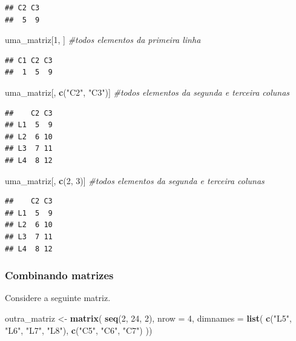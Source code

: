 \documentclass[
]{book}
\newenvironment{Shaded}{\begin{snugshade}}{\end{snugshade}}
\newcommand{\AttributeTok}[1]{\textcolor[rgb]{0.13,0.29,0.53}{#1}}
\newcommand{\CommentTok}[1]{\textcolor[rgb]{0.56,0.35,0.01}{\textit{#1}}}
\newcommand{\DecValTok}[1]{\textcolor[rgb]{0.00,0.00,0.81}{#1}}
\newcommand{\FunctionTok}[1]{\textcolor[rgb]{0.13,0.29,0.53}{\textbf{#1}}}
\newcommand{\NormalTok}[1]{#1}
\newcommand{\OtherTok}[1]{\textcolor[rgb]{0.56,0.35,0.01}{#1}}
\newcommand{\StringTok}[1]{\textcolor[rgb]{0.31,0.60,0.02}{#1}}
\begin{document}
\begin{verbatim}
## C2 C3 
##  5  9
\end{verbatim}

\begin{Shaded}
\begin{Highlighting}[]
\NormalTok{uma\_matriz[}\DecValTok{1}\NormalTok{, ] }\CommentTok{\#todos elementos da primeira linha}
\end{Highlighting}
\end{Shaded}

\begin{verbatim}
## C1 C2 C3 
##  1  5  9
\end{verbatim}

\begin{Shaded}
\begin{Highlighting}[]
\NormalTok{uma\_matriz[, }\FunctionTok{c}\NormalTok{(}\StringTok{"C2"}\NormalTok{, }\StringTok{"C3"}\NormalTok{)] }\CommentTok{\#todos elementos da segunda e terceira colunas}
\end{Highlighting}
\end{Shaded}

\begin{verbatim}
##    C2 C3
## L1  5  9
## L2  6 10
## L3  7 11
## L4  8 12
\end{verbatim}

\begin{Shaded}
\begin{Highlighting}[]
\NormalTok{uma\_matriz[, }\FunctionTok{c}\NormalTok{(}\DecValTok{2}\NormalTok{, }\DecValTok{3}\NormalTok{)] }\CommentTok{\#todos elementos da segunda e terceira colunas}
\end{Highlighting}
\end{Shaded}

\begin{verbatim}
##    C2 C3
## L1  5  9
## L2  6 10
## L3  7 11
## L4  8 12
\end{verbatim}

\subsubsection{Combinando matrizes}\label{combinando-matrizes}

Considere a seguinte matriz.

\begin{Shaded}
\begin{Highlighting}[]
\NormalTok{outra\_matriz }\OtherTok{\textless{}{-}} \FunctionTok{matrix}\NormalTok{(}
      \FunctionTok{seq}\NormalTok{(}\DecValTok{2}\NormalTok{, }\DecValTok{24}\NormalTok{, }\DecValTok{2}\NormalTok{),}
      \AttributeTok{nrow =} \DecValTok{4}\NormalTok{,}
      \AttributeTok{dimnames =} \FunctionTok{list}\NormalTok{(}
        \FunctionTok{c}\NormalTok{(}\StringTok{"L5"}\NormalTok{, }\StringTok{"L6"}\NormalTok{, }\StringTok{"L7"}\NormalTok{, }\StringTok{"L8"}\NormalTok{),}
        \FunctionTok{c}\NormalTok{(}\StringTok{"C5"}\NormalTok{, }\StringTok{"C6"}\NormalTok{, }\StringTok{"C7"}\NormalTok{)}
\NormalTok{      ))}
\end{Highlighting}
\end{Shaded}
\end{document}
